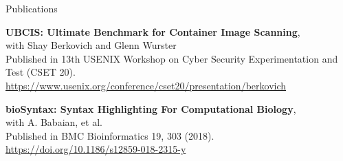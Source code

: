 \documentclass{cv}
\begin{document}
\begin{rSection}{Publications}
\begin{rSubsectionPure}
	\item \textbf{{UBCIS}: Ultimate Benchmark for Container Image Scanning}, \\
	with Shay Berkovich and Glenn Wurster \\
	Published in 13th {USENIX} Workshop on Cyber Security Experimentation and Test ({CSET} 20). \\
	\href{https://www.usenix.org/conference/cset20/presentation/berkovich}{https://www.usenix.org/conference/cset20/presentation/berkovich}
\end{rSubsectionPure}

\begin{rSubsectionPure}
	\item \textbf{bioSyntax: Syntax Highlighting For Computational Biology}, \\
	with A. Babaian, et al. \\
	Published in BMC Bioinformatics 19, 303 (2018). \\
	\href{https://doi.org/10.1186/s12859-018-2315-y}{https://doi.org/10.1186/s12859-018-2315-y}
\end{rSubsectionPure}
\end{rSection}
\end{document}
